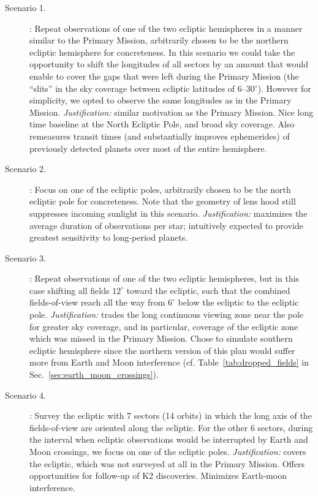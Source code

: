 \begin{description}

\item[Scenario 1.] \nhemi: Repeat observations of one of the two
  ecliptic hemispheres in a manner similar to the Primary Mission,
  arbitrarily chosen to be the northern ecliptic hemisphere for
  concreteness. In this scenario we could take the opportunity to 
  shift the longitudes of all sectors by an amount that would enable 
  \tess to cover the gaps that were left during the Primary Mission 
  (the ``slits'' in the sky coverage between ecliptic latitudes of 
  6--30$^\circ$).
  However for simplicity, we opted to observe the same longitudes as
  in the Primary Mission.
  \textit{Justification:} similar motivation as the Primary Mission.
  Nice long time baseline at the North Ecliptic Pole, and broad sky
  coverage. Also remeasures transit times (and substantially improves 
  ephemerides)
  of previously detected \tess planets over most of the entire
  hemisphere.

\item[Scenario 2.] \npole: Focus on one of the ecliptic poles,
	arbitrarily chosen to be the north ecliptic pole for
	concreteness. Note that the geometry of \tesss lens hood still
	suppresses incoming sunlight in this scenario.
	\textit{Justification:} maximizes the average duration of
	observations per star; intuitively expected to provide
	greatest sensitivity to long-period planets.

\item[Scenario 3.] \shemiAvoid: Repeat observations of one of the two
  ecliptic hemispheres, but in this case shifting all fields $12^\circ$
  toward the ecliptic, such that the combined fields-of-view reach all
  the way from $6^\circ$ below the ecliptic to the ecliptic pole.
  \textit{Justification:} trades the long continuous viewing zone near
  the pole for greater sky coverage, and in particular, coverage of
  the ecliptic zone which was missed in the Primary Mission.  Chose
  to simulate southern ecliptic hemisphere since the northern
  version of this plan would suffer more from Earth and Moon interference
  (cf. Table~\ref{tab:dropped_fields} in
  Sec.~\ref{sec:earth_moon_crossings}).
  
\item[Scenario 4.] \elong: Survey the ecliptic with 7 sectors (14
  orbits) in which the long axis of the fields-of-view are oriented
  along the ecliptic.  For the other 6 sectors, during the interval
  when ecliptic observations would be interrupted by Earth and Moon
  crossings, we focus on one of the ecliptic poles.
  \textit{Justification:} covers the ecliptic, which was not surveyed
  at all in the Primary Mission.  Offers opportunities for follow-up
  of K2 discoveries. Minimizes Earth-moon interference.
  

\end{description}

